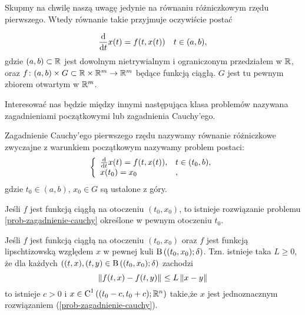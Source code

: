 \documentclass[12pt,a4paper]{report}
\begin{document}
Skupmy na chwilę naszą uwagę jedynie na równaniu różniczkowym rzędu pierwszego. Wtedy równanie takie przyjmuje oczywiście postać 

$$
\frac{\mathrm{d} {} }{\mathrm{d}{t}}x(t) = f(t,x(t)) \quad t \in (a,b) ,
$$ 
gdzie $(a,b) \subset \mathbb{R}$ jest dowolnym nietrywialnym i ograniczonym przedziałem w $\mathbb{R}$, oraz $ f \colon (a,b) \times G \subset \mathbb{R} \times \mathbb{R}^m \to \mathbb{R}^m$ będące funkcją ciągłą. $G$ jest tu pewnym zbiorem otwartym w $\mathbb{R}^m$. 

Interesować nas będzie między innymi następująca klasa problemów nazywana zagadnieniami początkowymi lub zagadnienia Cauchy'ego.

\begin{problem} \label{prob-zagadnienie-cauchy}
Zagadnienie Cauchy'ego pierwszego rzędu nazywamy równanie różniczkowe zwyczajne z warunkiem początkowym nazywamy problem postaci:
\begin{equation} 
\left\{\begin{array}{ll}
\frac{\mathrm{d} {} }{\mathrm{d}{t}} x(t) = f(t,x(t)), & t \in (t_0,b) ,\\
x(t_0) = x_0 &,
\end{array} \right.
\end{equation}
gdzie $t_0 \in (a,b)$, $x_0 \in G$ są ustalone z góry. 
\end{problem}

\begin{theorem}
Jeśli $f$ jest funkcją ciągłą na otoczeniu $(t_{0},x_{0})$, to istnieje rozwiązanie problemu \ref{prob-zagadnienie-cauchy} określone w pewnym otoczeniu $t_{0}$. 
\end{theorem}

\begin{theorem}
Jeśli $f$ jest funkcją ciągłą na otoczeniu $(t_{0},x_{0})$ oraz $f$ jest funkcją lipschtizowską względem $x$ w pewnej kuli $\ball{(t_0,x_0)}{\delta}$. Tzn.
 istnieje taka $L\geq 0$, że dla każdych $((t,x),(t,y) \in \ball{(t_0,x_0)}{\delta} $ zachodzi
$$
  \left\| {f(t,x) - f(t,y)} \right\|_{} \leq L \left\| { x-y} \right\|_{} 
$$
 to istnieje $ c> 0 $ i $x \in \Ck{1}{(t_0-c,t_0+c); \setR^{n} }  $ takie,że $x$ jest jednoznacznym rozwiązaniem (\ref{prob-zagadnienie-cauchy}).
\end{theorem}
\end{document}
